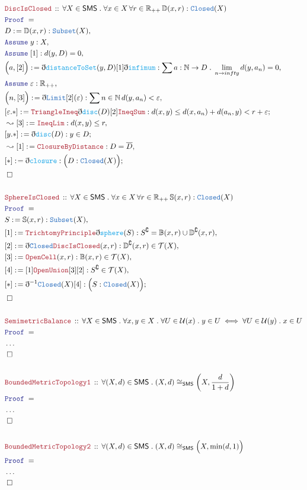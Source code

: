 \documentclass[12pt]{scrartcl}
\newcommand{\TYPE}[1]{\textcolor{NavyBlue}{\mathtt{#1}}}
\newcommand{\FUNC}[1]{\textcolor{Cerulean}{\mathtt{#1}}}
\newcommand{\LOGIC}[1]{\textcolor{Blue}{\mathtt{#1}}}
\newcommand{\THM}[1]{\textcolor{Maroon}{\mathtt{#1}}}
\renewcommand{\.}{\; . \;}
\newcommand{\de}{: \kern 0.1pc =}
\newcommand{\Theorem}[2]{& \THM{#1} \, :: \, #2 \\ & \Proof = \\ }
\newcommand{\Page}[1]{ \begin{align*} #1 \end{align*}   }
\newcommand{ \bd }{ \ByDef }
\newcommand{\NoProof}{ & \ldots \\ \EndProof}
\newcommand{\Reals}{\mathbb{R} }
\newcommand{\Nat}{\mathbb{N} }
\renewcommand{\c}{\complement}
\newcommand{\Say}[3]{& #1 \de #2 : #3, \\}
\newcommand{\Conclude}[3]{& #1 \de #2 : #3; \\}
\newcommand{\Derive}[3]{& \leadsto #1 \de #2 : #3, \\}
\newcommand{\Assume}[2]{& \LOGIC{Assume} \; #1 : #2, \\}
\newcommand{\QED}{\; \square}
\newcommand{\EndProof}{& \QED \\}
\newcommand{\ByDef}{\eth}
\newcommand{\Proof}{\LOGIC{Proof} \; }
\newcommand{\T}{\mathcal{T}}
\newcommand{\U}{\mathcal{U}}
\newcommand{\SMS}{\mathsf{SMS}}
\begin{document}
\Page{
	\Theorem{DiscIsClosed}
	{
		\forall X \in \SMS \. \forall x \in X \, \forall r \in \Reals_{++} \, \mathbb{D}(x,r) : \TYPE{Closed}(X)
	}
	\Say{D}{\mathbb{D}(x,r)}{\TYPE{Subset}(X)}
	\Assume{y}{X}
	\Assume{[1]}{d(y,D) = 0}
	\Say{\Big(a,[2] \Big)}{\bd \FUNC{distanceToSet}(y,D)[1]\bd \FUNC{infimum}}{\sum a : \Nat \to D \. \lim_{n \to infty} d(y, a_n) = 0}
	\Assume{\varepsilon}{\Reals_{++}}
	\Say{\Big(n,[3]\Big)}{\bd \TYPE{Limit}[2](\varepsilon)}{\sum n \in \Nat \, d(y,a_n) < \varepsilon}
	\Conclude{[\varepsilon.*]}{\THM{TriangleIneq}\bd \FUNC{disc}(D) [2] \THM{IneqSum}}{d(x,y) \le d(x,a_n) + d(a_n,y) <  r + \varepsilon}
	\Derive{[3]}{\THM{IneqLim}}{d(x,y) \le r }
	\Conclude{[y.*]}{\bd \FUNC{disc}(D)}{y \in D }
	\Derive{[1]}{\THM{ClosureByDistance}}{D = \overline{D}}
	\Conclude{[*]}{\bd \FUNC{closure}}{\Big( D : \TYPE{Closed}(X) \Big)}
	\EndProof
	\\
	\Theorem{SphereIsClosed}
	{
		\forall X \in \SMS \. \forall x \in X \, \forall r \in \Reals_{++} \, \mathbb{S}(x,r) : \TYPE{Closed}(X)
	}
	\Say{S}{\mathbb{S}(x,r)}{\TYPE{Subset}(X)}
	\Say{[1]}{\THM{TrichtomyPrinciple}\bd \FUNC{sphere}(S)}{S^\c = \mathbb{B}(x,r) \cup \mathbb{D}^\c(x,r)}
	\Say{[2]}{\bd  \TYPE{Closed} \THM{DiscIsClosed}(x,r)}{\mathbb{D}^\c(x,r) \in \T(X)}
	\Say{[3]}{\THM{OpenCell}(x,r)}{\mathbb{B}(x,r) \in \T(X)}
	\Say{[4]}{ [1] \THM{OpenUnion}[3] [2]  }{S^\c  \in \T(X)}
	\Conclude{[*]}{\bd^{-1} \TYPE{Closed}(X)[4]}{\Big(S : \TYPE{Closed}(X) \Big) }
	\EndProof
	\\
	\Theorem{SemimetricBalance}
	{
		\forall X \in \SMS \. \forall x,y \in X \. 
		\forall U \in \U(x) \. y \in U \iff \forall U \in \U(y) \. x \in U  
	}
	\NoProof
	\\
	\Theorem{BoundedMetricTopology1}{\forall (X,d) \in \SMS \.   (X,d)  \cong_{\SMS} \left(X, \frac{d}{1 + d}\right) }
	\NoProof
	\\
	\Theorem{BoundedMetricTopology2}{\forall (X,d) \in \SMS \. (X,d) \cong_{\SMS} \Big(X,\min(d,1)\Big)}
	\NoProof
}
\end{document}

